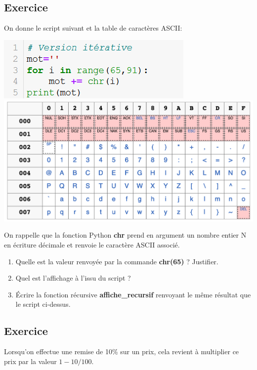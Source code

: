 \documentclass[11pt,a4paper]{article}
\newcounter{numexo}
\begin{document}
\addtocounter{numexo}{1}
\subsection*{\Large Exercice \thenumexo}
On donne le script suivant et la table de caractères ASCII:
\begin{center}
\includegraphics[scale=0.8]{img/alphabet.png}
\includegraphics[scale=0.4]{img/tableASCII.png}
\end{center}

On rappelle que la fonction Python \textbf{chr} prend en argument un nombre entier N en écriture décimale et renvoie le caractère ASCII associé.

\begin{enumerate}
\item Quelle est la valeur renvoyée par la commande \textbf{chr(65)} ? Justifier.
\item Quel est l'affichage à l'issu du script ?
\item Écrire la fonction récursive \textbf{affiche\_recursif} renvoyant le même résultat que le script ci-dessus.
\end{enumerate}

\addtocounter{numexo}{1}
\subsection*{\Large Exercice \thenumexo}
Lorsqu'on effectue une remise de 10\% sur un prix, cela revient à multiplier ce prix par la valeur $1-10/100$.
\end{document}
